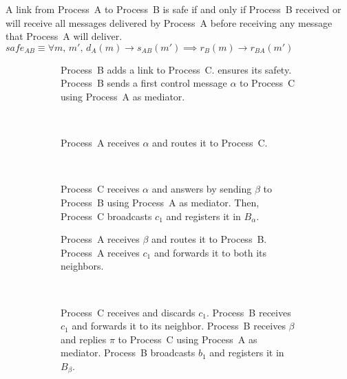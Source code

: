 \begin{definition}
  A link from Process~A to Process~B is safe if and only if Process~B received
  or will receive all messages delivered by Process~A before receiving any
  message that Process~A will
  deliver. $safe_{AB} \equiv \forall m,\, m',\, d_A(m) \rightarrow s_{AB}(m')
  \implies r_B(m) \rightarrow r_{BA}(m')$
\end{definition}

\begin{figure}
  \begin{center}
    \begin{subfigure}[t]{0.31\textwidth}
      \centering%
      \caption{\label{fig:solveA}Process~B adds a link to
        Process~C. \RPCBROADCAST ensures its safety. Process~B sends a first
        control message $\alpha$ to Process~C using Process~A as mediator.}
    \end{subfigure}
    ~
    \begin{subfigure}[t]{0.31\textwidth}
      \centering%
      \caption{\label{fig:solveB}Process~A receives $\alpha$ and routes it to
        Process~C.}
    \end{subfigure}
    ~
    \begin{subfigure}[t]{0.31\textwidth}
      \centering%
      \caption{\label{fig:solveC}Process~C receives $\alpha$ and answers by
        sending $\beta$ to Process~B using Process~A as mediator. Then,
        Process~C broadcasts $c_1$ and registers it in $B_\alpha$.}
    \end{subfigure}
    \begin{subfigure}[t]{0.48\textwidth}
      \centering%
      \caption{\label{fig:solveD}Process~A receives $\beta$ and routes it to
        Process~B.  Process~A receives $c_1$ and forwards it to both its
        neighbors.}
    \end{subfigure}
    ~
    \begin{subfigure}[t]{0.48\textwidth}
      \centering%
      \caption{\label{fig:solveE}Process~C receives and discards $c_1$.
        Process~B receives $c_1$ and forwards it to its neighbor.  Process~B
        receives $\beta$ and replies $\pi$ to Process~C using Process~A as
        mediator. Process~B broadcasts $b_1$ and registers it in $B_\beta$.}
    \end{subfigure}    
    \begin{subfigure}[t]{0.48\textwidth}

\end{subfigure}
\end{center}
\end{figure}
